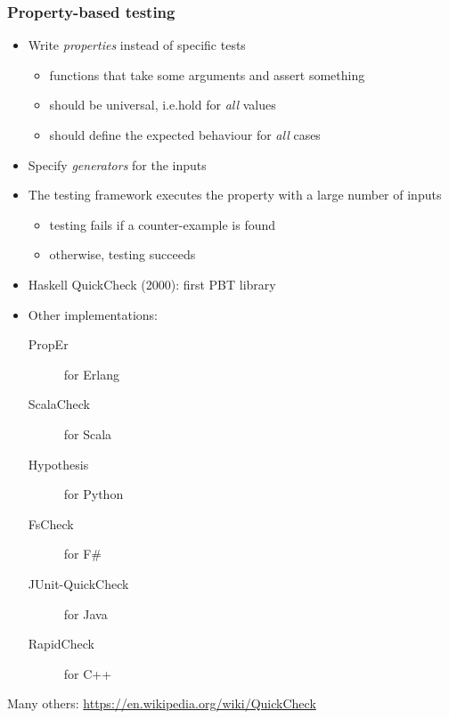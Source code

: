 \documentclass{beamer}
\begin{document}
\begin{frame}[allowframebreaks]
  \frametitle{Property-based testing}

\begin{itemize}
\item Write \emph{properties} instead of specific tests
  \begin{itemize}
  \item functions that take some arguments and assert something
  \item should be universal, i.e.\@ hold for \emph{all} values
  \item should define the expected behaviour for \emph{all} cases
\end{itemize}
\item Specify \emph{generators} for the inputs
\item The testing framework executes the property with
  a large number of inputs
  \begin{itemize}
  \item testing fails if a \alert{counter-example} is found
  \item otherwise, testing succeeds
  \end{itemize}
\end{itemize}

\framebreak

\begin{itemize}
\item Haskell QuickCheck (2000): first PBT library 
\item Other implementations:
  \begin{description}
  \item[PropEr] for Erlang
  \item[ScalaCheck] for Scala
  \item[Hypothesis] for Python
  \item[FsCheck] for F\#
  \item[JUnit-QuickCheck] for Java
  \item[RapidCheck] for C++
  \end{description}
\end{itemize}
\bigskip

Many others: \url{https://en.wikipedia.org/wiki/QuickCheck}
\end{frame}
\end{document}
